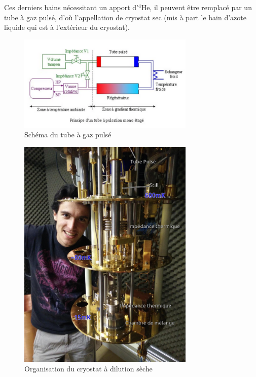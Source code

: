 \documentclass[a4paper,11pt]{report}
\newcommand{\HeQ}{$^4$He\xspace}
\begin{document}
Ces derniers bains nécessitant un apport d'\HeQ, il peuvent être remplacé par un tube à gaz pulsé, d'où l'appellation de cryostat sec (mis à part le bain d'azote liquide qui est à l'extérieur du cryostat).

\begin{figure}[h]
    \begin{center}
        \includegraphics[width=0.75\textwidth]{Images/Cryostat_PulseTube_Schema.png}
        \caption{Schéma du tube à gaz pulsé}
    \end{center}
\end{figure}

\begin{figure}[h]
    \begin{center}
        \includegraphics[width=0.75\textwidth]{Images/PhotoCryostat}
        \caption{Organisation du cryostat à dilution sèche}
    \end{center}
\end{figure}
\end{document}
